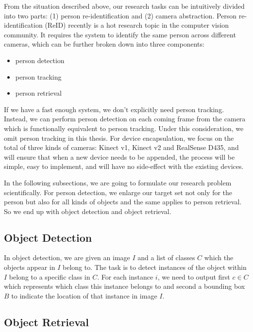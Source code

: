 From the situation described above, our research tasks can be
intuitively divided into two parts: 
(1) person re-identification and
(2) camera abstraction.
Person re-identification (ReID) recently is a hot research topic in the
computer vision community. It requires the system to identify the same person
across different cameras, which can be further broken down into three 
components:

\begin{itemize}
    \item person detection
    \item person tracking
    \item person retrieval
\end{itemize}

If we have a fast enough system, we don't explicitly need person tracking.
Instead, we can perform person detection on each coming frame 
from the camera which
is functionally equivalent to person tracking. Under this consideration, we
omit person tracking in this thesis.
For device encapsulation, we focus on the total of three kinds of
cameras: Kinect v1, Kinect v2 and RealSense D435, and will ensure that when
a new device needs to be appended, the process will be simple, easy to 
implement, and will have no side-effect with the existing devices.

In the following subsections, we are going to formulate our
research problem scientifically. For person detection, we enlarge our target
set not only for the person but also for all kinds of objects and the same 
applies to person retrieval. 
So we end up with object detection and object retrieval.

\subsection{Object Detection}

In object detection, we are given an image $I$ and a list of classes $C$ which
the objects appear in $I$ belong to. The task is to detect instances of the 
object within $I$ belong to a specific class in $C$.
For each instance $i$, we need to output first $c \in C$ which represents 
which class this instance belongs to and second a bounding box $B$ to indicate 
the location of that instance in image $I$.

\subsection{Object Retrieval}


